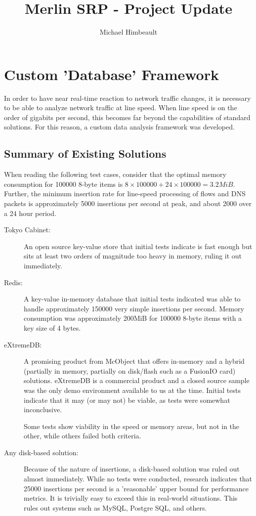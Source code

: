 \documentclass{article}
\theoremstyle{remark}
\theoremstyle{definition}
\theoremstyle{definition}
\theoremstyle{definition}
\begin{document}

\title{Merlin SRP - Project Update}
\author{Michael Himbeault}

\maketitle

\section{Custom 'Database' Framework}
In order to have near real-time reaction to network traffic changes, it is necessary to be able to analyze network traffic at line speed. When line speed is on the order of gigabits per second, this becomes far beyond the capabilities of standard solutions. For this reason, a custom data analysis framework was developed.

\subsection{Summary of Existing Solutions}
When reading the following test cases, consider that the optimal memory consumption for 100000 8-byte items is $8\times100000+24\times100000=3.2MiB$. Further, the minimum insertion rate for line-speed processing of flows and DNS packets is approximately 5000 insertions per second at peak, and about 2000 over a 24 hour period.

\begin{description}
\item[Tokyo Cabinet: ] An open source key-value store that initial tests indicate is fast enough but sits at least two orders of magnitude too heavy in memory, ruling it out immediately.
\item[Redis: ] A key-value in-memory database that initial tests indicated was able to handle approximately 150000 very simple insertions per second. Memory consumption was approximately 200MiB for 100000 8-byte items with a key size of 4 bytes.
\item[eXtremeDB: ] A promising product from McObject that offers in-memory and a hybrid (partially in memory, partially on disk/flash such as a FusionIO card) solutions. eXtremeDB is a commercial product and a closed source sample was the only demo environment available to us at the time. Initial tests indicate that it may (or may not) be viable, as tests were somewhat inconclusive.

Some tests show viability in the speed or memory areas, but not in the other, while others failed both criteria.
\item[Any disk-based solution: ] Because of the nature of insertions, a disk-based solution was ruled out almost immediately. While no tests were conducted, research indicates that 25000 insertions per second is a 'reasonable' upper bound for performance metrics. It is trivially easy to exceed this in real-world situations. This rules out systems such as MySQL, Postgre SQL, and others.
\end{description}
\end{document}
